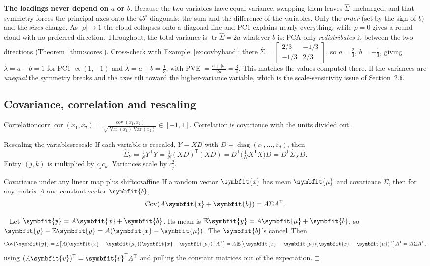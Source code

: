 \documentclass[11pt]{article}
\newcommand{\bm}[1]{\symbfit{#1}}
\newenvironment{proofsketch}{\par\noindent{\itshape Proof.}\ }{\hfill$\mdlgwhtsquare$\par}
\newcommand{\vx}{\bm{x}}
\newcommand{\vy}{\bm{y}}
\newcommand{\Sig}{\widehat{\Sigma}}
\newcommand{\T}{^{\mathsf T}}
\newcommand{\tr}{\operatorname{tr}}
\newcommand{\diag}{\operatorname{diag}}
\begin{document}
\begin{intuition}
\textbf{The loadings never depend on $a$ or $b$.} Because the two variables have equal variance, swapping them leaves $\Sig$
unchanged, and that symmetry forces the principal axes onto the $45^\circ$ diagonals: the sum and the difference of the
variables. Only the \emph{order} (set by the sign of $b$) and the \emph{sizes} change. As $|\rho|\to1$ the cloud collapses onto a
diagonal line and PC1 explains nearly everything, while $\rho=0$ gives a round cloud with no preferred direction. Throughout,
the total variance is $\tr\Sig=2a$ whatever $b$ is: PCA only \emph{redistributes} it between the two directions
(Theorem~\ref{thm:scores}). Cross-check with Example~\ref{ex:covbyhand}: there $\Sig=\begin{bmatrix}2/3&-1/3\\-1/3&2/3\end{bmatrix}$, so $a=\tfrac23$, $b=-\tfrac13$, giving
$\lambda=a-b=1$ for PC1 $\propto(1,-1)$ and $\lambda=a+b=\tfrac13$, with PVE $=\tfrac{a+|b|}{2a}=\tfrac34$. This matches the values computed there.
If the variances are \emph{unequal} the symmetry breaks and the axes tilt toward the higher-variance variable,
which is the scale-sensitivity issue of Section~2.6.
\end{intuition}

\subsection{Covariance, correlation and rescaling}

\begin{definition}{Correlation}{corr}
$\displaystyle \operatorname{cor}(x_1,x_2)=\frac{\operatorname{cov}(x_1,x_2)}{\sqrt{\operatorname{Var}(x_1)\operatorname{Var}(x_2)}}\in[-1,1]$.
Correlation is covariance with the units divided out.
\end{definition}

\begin{proposition}{Rescaling the variables}{rescale}
If each variable is rescaled, $Y=XD$ with $D=\diag(c_1,\dots,c_d)$, then
\[
\Sig_Y=\tfrac1N Y\T Y=\tfrac1N(XD)\T(XD)=D\T\Big(\tfrac1N X\T X\Big)D=D\T\Sig_X D .
\]
Entry $(j,k)$ is multiplied by $c_jc_k$. Variances scale by $c_j^2$.
\end{proposition}

\begin{proposition}{Covariance under any linear map plus shift}{covaffine}
If a random vector $\vx$ has mean $\bm\mu$ and covariance $\Sigma$, then for any matrix $A$ and constant vector $\bm b$,
\[
\operatorname{Cov}(A\vx+\bm b)=A\Sigma A\T .
\]
\end{proposition}
\begin{proofsketch}
Let $\vy=A\vx+\bm b$. Its mean is $\mathbb E\vy=A\bm\mu+\bm b$, so $\vy-\mathbb E\vy=A(\vx-\bm\mu)$. The $\bm b$'s cancel. Then
\[
\operatorname{Cov}(\vy)=\mathbb E\big[A(\vx-\bm\mu)(\vx-\bm\mu)\T A\T\big]=A\,\mathbb E\big[(\vx-\bm\mu)(\vx-\bm\mu)\T\big]A\T=A\Sigma A\T,
\]
using $(A\bm v)\T=\bm v\T A\T$ and pulling the constant matrices out of the expectation.
\end{proofsketch}
\end{document}
